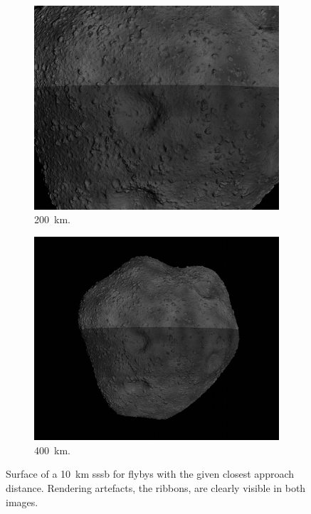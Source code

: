 \begin{figure}[htb]
\begin{subfigure}[b]{0.32\textwidth}
            \includegraphics[width=\textwidth]{doc/thesis/0_figures/rendering_artefacts/200_10_SssbOnly_2017-08-15T115845-190000.jpg}
            \caption{\SI{200}{\kilo\meter}.}
            \label{fig:render_artefacts_200}
        \end{subfigure}
        \begin{subfigure}[b]{0.32\textwidth}
            \centering
            \includegraphics[width=\textwidth]{doc/thesis/0_figures/rendering_artefacts/400_10_SssbOnly_2017-08-15T115845-190000.jpg}
            \caption{\SI{400}{\kilo\meter}.}
            \label{fig:render_artefacts_400}
        \end{subfigure}
    \caption{Surface of a \SI{10}{\kilo\meter} \gls{sssb} for flybys with the given closest approach distance. Rendering artefacts, the ribbons, are clearly visible in both images.}
    \label{fig:render_artefacts}
\end{figure}

